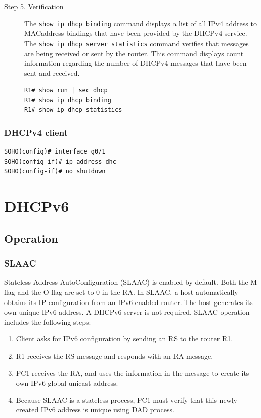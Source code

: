 \begin{description}
\item[Step 5. Verification] The \verb|show ip dhcp binding| command displays a list of all IPv4 address to MACaddress bindings that have been provided by the DHCPv4 service. The \verb|show ip dhcp server statistics| command verifies that messages are being received or sent by the router. This command displays count information regarding the number of DHCPv4 messages that have been sent and received.

\begin{verbatim}
R1# show run | sec dhcp
R1# show ip dhcp binding
R1# show ip dhcp statistics
\end{verbatim}
\end{description}

\subsection{DHCPv4 client}

\begin{verbatim}
SOHO(config)# interface g0/1
SOHO(config-if)# ip address dhc
SOHO(config-if)# no shutdown
\end{verbatim}


\chapter{DHCPv6}

\section{Operation}

\subsection{SLAAC}

Stateless Address AutoConfiguration (SLAAC) is enabled by default. Both the M flag and the O flag are set to 0 in the RA. In SLAAC, a host automatically obtains its IP configuration from an IPv6-enabled router. The host generates its own unique IPv6 address. A DHCPv6 server is not required. SLAAC operation includes the following steps:

\begin{enumerate}
\item Client asks for IPv6 configuration by sending an RS to the router R1.
\item R1 receives the RS message and responds with an RA message.
\item PC1 receives the RA, and uses the information in the message to create its own IPv6 global unicast address. 
\item Because SLAAC is a stateless process, PC1 must verify that this newly created IPv6 address is unique using DAD process.
\end{enumerate}

